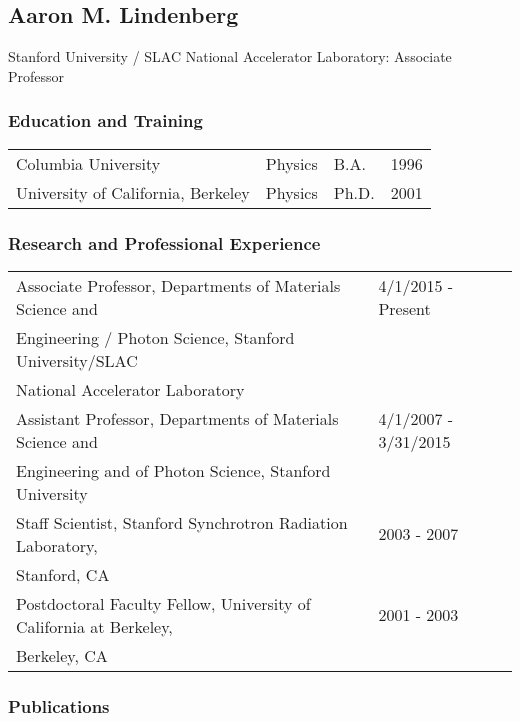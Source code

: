 \subsection*{Aaron M. Lindenberg}

Stanford University / SLAC National Accelerator Laboratory: Associate Professor

\subsubsection*{Education and Training}
\begin{table}[ht]
    \centering
    \begin{tabular}{llll}
       Columbia University  & Physics & B.A. & 1996 \\
        University of California, Berkeley & Physics & Ph.D. & 2001 \\
    \end{tabular}
 \end{table}
 
\subsubsection*{Research and Professional Experience}
 
 \begin{table}[ht]
     \centering
     \begin{tabular}{ll}
        Associate Professor, Departments of Materials Science and &  4/1/2015 - Present  \\ 
        Engineering / Photon Science, Stanford University/SLAC &\\ 
        National Accelerator Laboratory & \\
        Assistant Professor, Departments of Materials Science and & 4/1/2007 - 3/31/2015\\
        Engineering and of Photon Science, Stanford University &  \\
        Staff Scientist, Stanford Synchrotron Radiation Laboratory, & 2003 - 2007 \\ 
        Stanford, CA &\\
         Postdoctoral Faculty Fellow, University of California at Berkeley, & 2001 - 2003 \\ 
         Berkeley, CA & \\
     \end{tabular}
 \end{table}
 
\subsubsection*{Publications}
 
